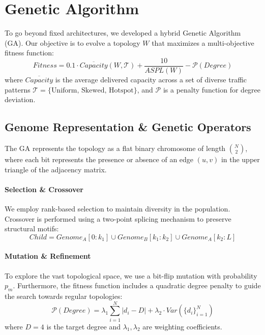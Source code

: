 \documentclass{article}
\begin{document}
    \section{Genetic Algorithm}
    \label{sec:ga}
    To go beyond fixed architectures, we developed a hybrid Genetic Algorithm (GA). Our objective is to evolve a topology $W$ that maximizes a multi-objective fitness function:
    \[
        Fitness = 0.1 \cdot \overline{Capacity}(W, \mathcal{T}) + \frac{10}{ASPL(W)} - \mathcal{P}(Degree)
    \]
    where $\overline{Capacity}$ is the average delivered capacity across a set of diverse traffic patterns $\mathcal{T} = \{ \text{Uniform, Skewed, Hotspot} \}$, and $\mathcal{P}$ is a penalty function for degree deviation.

    \subsection{Genome Representation \& Genetic Operators}
    The GA represents the topology as a flat binary chromosome of length $\binom{N}{2}$, where each bit represents the presence or absence of an edge $(u, v)$ in the upper triangle of the adjacency matrix.

    \paragraph{Selection \& Crossover}
    We employ rank-based selection to maintain diversity in the population. Crossover is performed using a two-point splicing mechanism to preserve structural motifs:
    \begin{equation}
        Child = Genome_{A}[0:k_1] \cup Genome_{B}[k_1:k_2] \cup Genome_{A}[k_2:L]
    \end{equation}

    \paragraph{Mutation \& Refinement}
    To explore the vast topological space, we use a bit-flip mutation with probability $p_m$. Furthermore, the fitness function includes a quadratic degree penalty to guide the search towards regular topologies:
    \begin{equation}
        \mathcal{P}(Degree) = \lambda_1 \sum_{i=1}^N |d_i - D| + \lambda_2 \cdot Var(\{d_i\}_{i=1}^N)
    \end{equation}
    where $D=4$ is the target degree and $\lambda_1, \lambda_2$ are weighting coefficients.
\end{document}
